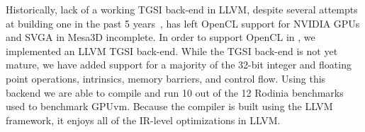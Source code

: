 Historically, lack of a working TGSI back-end in LLVM, despite several attempts
at building one in the past 5 years~\cite{old_llvm_tgsi1,old_llvm_tgsi2}, has
left OpenCL support for NVIDIA GPUs and SVGA in Mesa3D incomplete.
In order to support OpenCL in \trxc, we implemented an LLVM TGSI back-end.
While the TGSI back-end is not yet mature, we have added
support for a majority of the 32-bit integer and floating point operations,
intrinsics, memory barriers, and control flow. Using this backend we are
able to compile and run 10 out of the 12 Rodinia benchmarks~\cite{che2009rodinia}
used to benchmark GPUvm. Because the compiler is built using the LLVM framework,
it enjoys all of the IR-level optimizations in LLVM.



